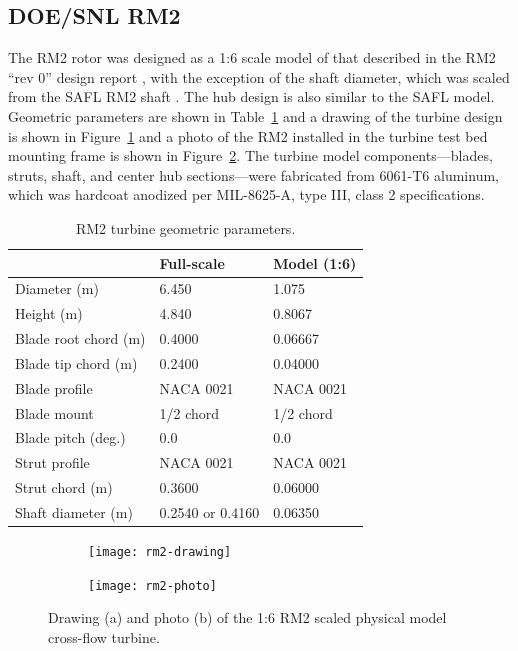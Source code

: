 \subsection{DOE/SNL RM2}

The RM2 rotor was designed as a 1:6 scale model of that described in the RM2
``rev 0'' design report \cite{Barone2011}, with the exception of the shaft
diameter, which was scaled from the SAFL RM2 shaft \cite{Hill2014}. The hub
design is also similar to the SAFL model. Geometric parameters are shown in
Table~\ref{tab:RM2-geom} and a drawing of the turbine design is shown in
Figure~\ref{fig:rm2-drawing} and a photo of the RM2 installed in the turbine
test bed mounting frame is shown in Figure~\ref{fig:rm2-photo}. The turbine
model components---blades, struts, shaft, and center hub sections---were
fabricated from 6061-T6 aluminum, which was hardcoat anodized per MIL-8625-A,
type III, class 2 specifications.

\begin{table}
    \centering
    \begin{tabular}{l|l|l}
        & Full-scale & Model (1:6) \\
        \hline 
        Diameter (m)   & 6.450 & 1.075 \\ 
        Height (m)     & 4.840 & 0.8067 \\ 
        Blade root chord (m) & 0.4000 & 0.06667 \\ 
        Blade tip chord (m)  & 0.2400 & 0.04000 \\ 
        Blade profile & NACA 0021 & NACA 0021 \\ 
        Blade mount & 1/2 chord & 1/2 chord \\ 
        Blade pitch (deg.) & 0.0 & 0.0 \\ 
        Strut profile & NACA 0021 & NACA 0021 \\ 
        Strut chord (m) & 0.3600 & 0.06000 \\ 
        Shaft diameter (m) & 0.2540 \cite{Beam2011} or 0.4160 \cite{Hill2014} & 0.06350\\ 
    \end{tabular}
    \caption{RM2 turbine geometric parameters.}
    \label{tab:RM2-geom}
\end{table}

\begin{figure}
    \centering
    
    \begin{subfigure}{0.45\textwidth}
        \centering
        \texttt{[image: rm2-drawing]}
        \caption{}
        \label{fig:rm2-drawing}
    \end{subfigure}
    \begin{subfigure}{0.41\textwidth}
        \centering
        \texttt{[image: rm2-photo]}
        
        \caption{}
        \label{fig:rm2-photo}
    \end{subfigure}
    
    \caption{Drawing (a) and photo (b) of the 1:6 RM2 scaled physical model cross-flow turbine.}
    \label{fig:rm2}
\end{figure}


